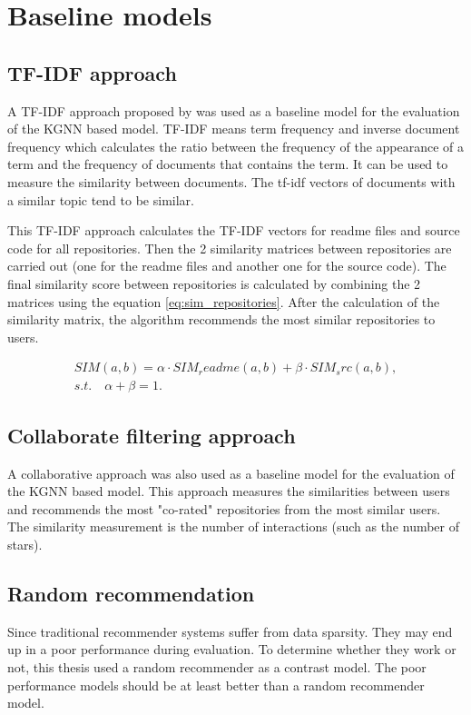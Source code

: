 \documentclass[11pt,twoside]{report}
\begin{document}
\section{Baseline models}
\subsection{TF-IDF approach}
A TF-IDF approach proposed by \cite{sun_personalized_2018} was used as a baseline model for the evaluation of the KGNN based model. TF-IDF means term frequency and inverse document frequency which calculates the ratio between the frequency of the appearance of a term and the frequency of documents that contains the term. It can be used to measure the similarity between documents. The tf-idf vectors of documents with a similar topic tend to be similar.

This TF-IDF approach calculates the TF-IDF vectors for readme files and source code for all repositories. Then the 2 similarity matrices between repositories are carried out (one for the readme files and another one for the source code). The final similarity score between repositories is calculated by combining the 2 matrices using the equation \ref{eq:sim_repositories}. After the calculation of the similarity matrix, the algorithm recommends the most similar repositories to users.

\begin{gather}
    SIM(a,b)=\alpha\cdot{SIM_readme(a,b)}+\beta\cdot{SIM_src(a,b)}, \\
    s.t.\quad\alpha+\beta=1.
    \label{eq:sim_repositories}
\end{gather}

\subsection{Collaborate filtering approach}
A collaborative approach \cite{guendouz_recommending_2015} was also used as a baseline model for the evaluation of the KGNN based model. This approach measures the similarities between users and recommends the most "co-rated" repositories from the most similar users. The similarity measurement is the number of interactions (such as the number of stars).


\subsection{Random recommendation}
Since traditional recommender systems suffer from data sparsity. They may end up in a poor performance during evaluation. To determine whether they work or not, this thesis used a random recommender as a contrast model. The poor performance models should be at least better than a random recommender model.
\end{document}
